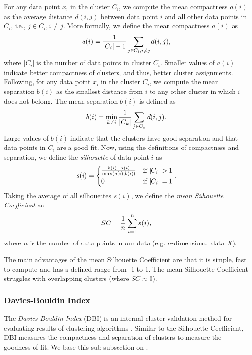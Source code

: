 For any data point $x_i$ in the cluster $C_i$, we compute the mean compactness $a(i)$ as the average distance $d(i, j)$ between data point $i$ and all other data points in $C_i$, i.e., $j \in C_i, i \neq j$. More formally, we define the mean compactness $a(i)$ as
\begin{align}
    a(i) = \frac{1}{|C_i| - 1} \sum\limits_{j \in C_i, i \neq j}^{}{d(i, j)},
    \label{eqn:silhouette-coef-a}
\end{align}
where $|C_i|$ is the number of data points in cluster $C_i$. Smaller values of $a(i)$ indicate better compactness of clusters, and thus, better cluster assignments. Following, for any data point $x_i$ in the cluster $C_i$, we compute the mean separation $b(i)$ as the smallest distance from $i$ to any other cluster in which $i$ does not belong. The mean separation $b(i)$ is defined as
\begin{align}
    b(i) = \min_{k \neq i} \frac{1}{|C_k|} \sum\limits_{j \in C_k}^{}{d(i, j)}.
    \label{eqn:silhouette-coef-b}
\end{align}
Large values of $b(i)$ indicate that the clusters have good separation and that data points in $C_i$ are a good fit. Now, using the definitions of compactness and separation, we define the \textit{silhouette} of data point $i$ as
\begin{align}
    s(i) = \begin{cases}
        \frac{b(i) - a(i)}{\max \left(a(i), b(i)\right)} & \mbox{if } |C_i| > 1 \\
        0 & \mbox{if } |C_i| = 1
    \end{cases}.
\end{align}
Taking the average of all silhouettes $s(i)$, we define the \textit{mean Silhouette Coefficient} as
\begin{align}
    SC = \frac{1}{n} \sum\limits_{i=1}^{n}{s(i)},
    \label{eqn:silhouette-coef}
\end{align}
where $n$ is the number of data points in our data (e.g. $n$-dimensional data $X$).

The main advantages of the mean Silhouette Coefficient are that it is simple, fast to compute and has a defined range from -1 to 1. The mean Silhouette Coefficient struggles with overlapping clusters (where $SC \approx 0$).

\subsubsection{Davies-Bouldin Index}
\label{sec:davies-bouldin-index}
The \textit{Davies-Bouldin Index} (DBI) is an internal cluster validation method for evaluating results of clustering algorithms \cite{DaviesBouldin1979}. Similar to the Silhouette Coefficient, DBI measures the compactness and separation of clusters to measure the goodness of fit. We base this sub-subsection on \cite{DaviesBouldin1979}.

